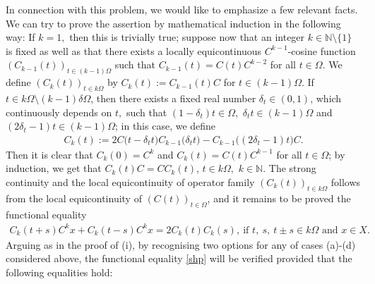 \documentclass{amsart}
\theoremstyle{definition}
\theoremstyle{remark}
\numberwithin{equation}{section}
\begin{document}
In connection with this problem, we would like to emphasize a few relevant facts. We can try to prove the assertion by mathematical induction in the following way: If $k=1,$ then this is trivially true; suppose now that an integer $k\in {\mathbb N} \setminus \{1\}$ is fixed as well as that there exists a locally equicontinuous $C^{k-1}$-cosine function $(C_{k-1}(t))_{t\in (k-1)\Omega}$ such that $C_{k-1}(t)=C(t)C^{k-2}$ for all $t\in \Omega.$ We define $(C_{k}(t))_{t\in k\Omega}$ by $C_{k}(t):=C_{k-1}(t)C$ for $t\in (k-1) \Omega$. If $t\in k\Omega \setminus (k-1)\delta \Omega$, then there exists a fixed real number $\delta_{t} \in (0,1)$, which continuously depends on $t,$ such that $(1-\delta_{t})t\in \Omega,$ $\delta_{t}t\in (k-1)\Omega$ and $(2\delta_{t}-1)t\in (k-1)\Omega$; in this case, we define 
\begin{align*}
C_{k}(t):=2C\bigl(t-\delta_{t}t\bigr)C_{k-1}\bigl(\delta_{t}t\bigr)-C_{k-1}\bigl((2\delta_{t}-1)t\bigr)C.
\end{align*} 
Then it is clear that $C_{k}(0)=C^{k}$ and $C_{k}(t)=C(t)C^{k-1}$ for all $t\in \Omega$; by induction, we get that $C_{k}(t)C=CC_{k}(t)$, $t\in k\Omega,$ $k\in {\mathbb N}.$ The strong continuity and the local equicontinuity of operator family $(C_{k}(t))_{t\in k\Omega}$ follows from the local equicontinuity of $(C(t))_{t\in \Omega}$, and it remains to be proved the functional equality
\begin{align}\label{shp}
C_{k}(t+s)C^{k}x+C_{k}(t-s)C^{k}x=2C_{k}(t)C_{k}(s),\ \mbox{if }t,\ s,\ t\pm s \in k\Omega \mbox{ and } x\in X.
\end{align}
Arguing as in the proof of (i), by recognising two options for any of cases (a)-(d) considered above, the functional equality \eqref{shp} will be verified provided that the following equalities hold: 
\end{document}
